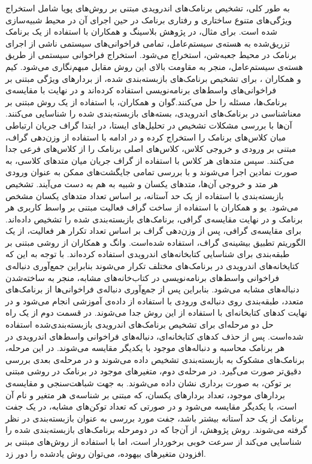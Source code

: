به طور کلی، تشخیص برنامک‌های اندرویدی مبتنی بر روش‌های پویا شامل استخراج ویژگی‌های متنوع ساختاری و رفتاری برنامک در حین اجرای آن در محیط‌ شبیه‌سازی شده ‌است. برای مثال، در پژوهش بلاسینگ و همکاران  با استفاده از یک برنامک تزریق‌شده به هسته‌‌ی سیستم‌عامل، تمامی فراخوانی‌های سیستمی ناشی از اجرای برنامک در محیط جعبه‌شن، استخراج می‌شود. استخراج فراخوانی سیستمی از طریق هسته‌ی سیستم‌عامل، منجر به مقاومت بالای این روش مقابل مبهم‌نگاری می‌شود. کیم‌ و همکاران ، برای تشخیص برنامک‌های بازبسته‌بندی شده، از بردار‌های ویژگی مبتنی بر فراخوانی‌های واسط‌های برنامه‌نویسی‌ استفاده کرده‌اند و در نهایت با مقایسه‌ی برنامک‌ها، مسئله‌ را حل می‌کنند.گوان و همکاران، با استفاده از یک روش مبتنی بر معناشناسی‌ در برنامک‌های اندرویدی، بسته‌های بازبسته‌بندی شده را شناسایی می‌کنند. آن‌ها با بررسی مشکلات تشخیص در تحلیل‌های ایستا، در ابتدا گراف جریان ارتباطی مبان کلاس‌های برنامک‌ را استخراج کرده و در ادامه با استفاده از وزن‌دهی گراف، مبتنی بر ورودی و خروجی کلاس، کلاس‌های اصلی برنامک را از کلاس‌های فرعی  جدا می‌کنند. سپس متد‌های هر کلاس با استفاده از گراف جریان میان متد‌های کلاسی، به صورت نمادین اجرا می‌شوند و با بررسی تمامی جایگشت‌های ممکن به عنوان ورودی هر متد و خروجی آن‌ها، متد‌های یکسان و شبیه به هم به دست می‌آیند. تشخیص بازبسته‌بندی با استفاده از یک حد آستانه، بر اساس تعداد متد‌های یکسان مشخص می‌شود. یو و همکاران با استفاده از ساخت گراف فعالیت مبتنی بر واسط کاربری هر برنامک و در نهایت مقایسه‌ی گرافی، برنامک‌های بازبسته‌بندی شده را تشخیص داده‌اند. برای مقایسه‌ی گرافی، پس از وزن‌دهی گراف بر اساس تعداد تکرار هر فعالیت، از یک الگوریتم تطبیق بیشینه‌ی گراف، استفاده شده‌است.
وانگ و همکاران از روشی مبتنی بر طبقه‌بندی برای شناسایی کتابخانه‌های اندرویدی استفاده کرده‌اند. با توجه به این که کتایخانه‌های اندرویدی در برنامک‌های مختلف تکرار می‌شوند بنابراین جمع‌آوری دنباله‌ی فراخوانی‌ واسط‌های برنامه‌نویسی در کتاب‌خانه‌های مشابه، منجر به ساخته‌شدن دنباله‌های مشابه می‌شود. بنابراین پس از جمع‌آوری دنباله‌ی فراخوانی‌ها از برنامک‌های متعدد، طبقه‌بندی روی دنباله‌ی ورودی با استفاده از داده‌ی آموزشی انجام می‌شود و در نهایت کد‌های کتابخانه‌ای با استفاده از این روش جدا می‌شوند. در قسمت دوم از یک راه حل دو مرحله‌ای برای تشخیص برنامک‌های اندرویدی بازبسته‌بندی‌شده استفاده شده‌است. پس از حذف کد‌های کتابخانه‌ای، دنباله‌های فراخوانی واسط‌های اندرویدی در هر برنامک محاسبه و دنباله‌های موجود با یکدیگر مقایسه می‌شوند. در این مرحله، برنامک‌های مشکوک به بازبسته‌بندی تشخیص داده می‌شوند و در مرحله‌ی بعدی بررسی دقیق‌تر صورت می‌گیرد. در مرحله‌ی دوم، متغیر‌های موجود در برنامک در روشی مبتنی بر توکن‌، به صورت برداری نشان داده می‌شوند. به جهت شباهت‌سنجی و مقایسه‌ی بردار‌های موجود، تعداد بردار‌های یکسان، که مبتنی بر شناسه‌ی هر متغیر و نام آن است، با یکدیگر مقایسه می‌شود و در صورتی که تعداد توکن‌های مشابه، در یک جفت برنامک از یک حد آستانه بیشتر باشد، جفت مورد بررسی به عنوان بازبسته‌بندی در نظر گرفته می‌شوند. روش پژوهش، از آن‌جا که در دومرحله برنامک‌های بازبسته‌بندی شده را شناسایی می‌کند از سرعت خوبی برخوردار است، اما با استفاده از روش‌های مبتنی بر افزودن متغیر‌های بیهوده، می‌توان روش یاد‌شده را دور زد.

